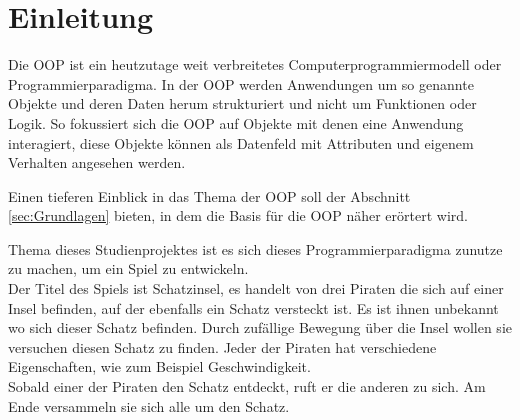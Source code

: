 \documentclass[
	12pt, %
	a4paper,
	listof=totoc, %
	bibliography=totoc, %
	numbers=noenddot, %
	ngerman, %
	headsepline, %
	oneside %
	]{scrbook} %
\begin{document}
\newpage

\tableofcontents{}

\listoffigures

%

\printnoidxglossaries

\clearpage



\chapter{Einleitung}\label{sec:einleitung}
Die \gls{OOP} ist ein heutzutage weit verbreitetes Computerprogrammiermodell oder Programmierparadigma. In der \gls{OOP} werden Anwendungen um so genannte Objekte und deren Daten herum strukturiert und nicht um Funktionen oder Logik. So fokussiert sich die \gls{OOP} auf Objekte mit denen eine Anwendung interagiert, diese Objekte können als Datenfeld mit Attributen und eigenem Verhalten angesehen werden.

Einen tieferen Einblick in das Thema der \gls{OOP} soll der Abschnitt \ref{sec:Grundlagen} bieten, in dem die Basis für die \gls{OOP} näher erörtert wird.

Thema dieses Studienprojektes ist es sich dieses Programmierparadigma zunutze zu machen, um ein Spiel zu entwickeln.\\
Der Titel des Spiels ist \glqq Schatzinsel\grqq, es handelt von drei Piraten die sich auf einer Insel befinden, auf der ebenfalls ein Schatz versteckt ist. Es ist ihnen unbekannt wo sich dieser Schatz befinden. Durch zufällige Bewegung über die Insel wollen sie versuchen diesen Schatz zu finden. Jeder der Piraten hat verschiedene Eigenschaften, wie zum Beispiel Geschwindigkeit.\\
Sobald einer der Piraten den Schatz entdeckt, ruft er die anderen zu sich. Am Ende versammeln sie sich alle um den Schatz.
\end{document}
